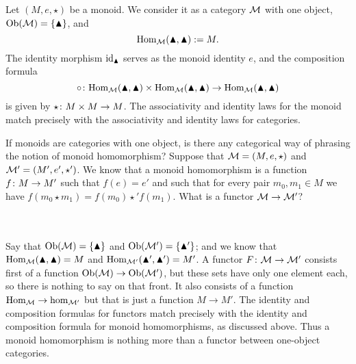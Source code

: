 \documentclass[CT4S-EN-RU]{subfiles}
\begin{document}
\paragraph{} ~\\

\begin{blockENG}
Let $(M,e,\star)$ be a monoid. We consider it as a category $\mathcal{M}$ with one object, $\textnormal{Ob}(\mathcal{M})=\{\blacktriangle\}$, and $$\textnormal{Hom}_\mathcal{M}(\blacktriangle,\blacktriangle):=M.$$ The identity morphism $\textnormal{id}_\blacktriangle$ serves as the monoid identity $e$, and the composition formula $$\circ\colon\textnormal{Hom}_\mathcal{M}(\blacktriangle,\blacktriangle)\times\textnormal{Hom}_\mathcal{M}(\blacktriangle,\blacktriangle)\rightarrow\textnormal{Hom}_\mathcal{M}(\blacktriangle,\blacktriangle)$$ is given by $\star\colon M\times M\rightarrow M$. The associativity and identity laws for the monoid match precisely with the associativity and identity laws for categories.
\end{blockENG}

\begin{blockRUS}
\end{blockRUS}

\begin{blockENG}
If monoids are categories with one object, is there any categorical way of phrasing the notion of monoid homomorphism? Suppose that $\mathcal{M}=(M,e,\star)$ and $\mathcal{M}'=(M',e',\star')$. We know that a monoid homomorphism is a function $f\colon M\rightarrow M'$ such that $f(e)=e'$ and such that for every pair $m_0,m_1\in M$ we have $f(m_0\star m_1)=f(m_0)\star' f(m_1)$. What is a functor $\mathcal{M}\rightarrow\mathcal{M}'$? 
\end{blockENG}

\begin{blockRUS}
\end{blockRUS}

\paragraph{} ~\\

\begin{blockENG}
Say that $\textnormal{Ob}(\mathcal{M})=\{\blacktriangle\}$ and $\textnormal{Ob}(\mathcal{M}')=\{\blacktriangle'\}$; and we know that $\textnormal{Hom}_\mathcal{M}(\blacktriangle,\blacktriangle)=M$ and $\textnormal{Hom}_{\mathcal{M}'}(\blacktriangle',\blacktriangle')=M'$. A functor $F\colon\mathcal{M}\rightarrow\mathcal{M}'$ consists first of a function $\textnormal{Ob}(\mathcal{M})\rightarrow\textnormal{Ob}(\mathcal{M}')$, but these sets have only one element each, so there is nothing to say on that front. It also consists of a function $\textnormal{Hom}_\mathcal{M}\rightarrow\hom_{\mathcal{M}'}$ but that is just a function $M\to M'$. The identity and composition formulas for functors match precisely with the identity and composition formula for monoid homomorphisms, as discussed above. Thus a monoid homomorphism is nothing more than a functor between one-object categories. 
\end{blockENG}
\end{document}
